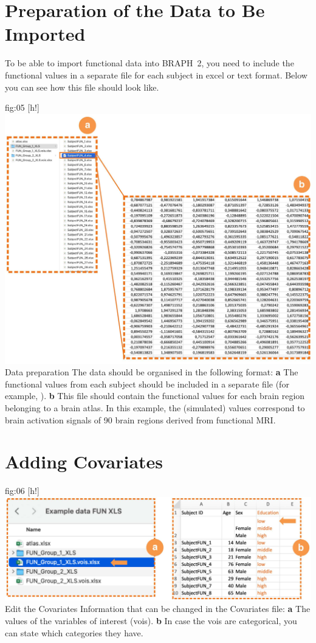 \documentclass[justified]{tufte-handout}
\begin{document}
\clearpage
\section{Preparation of the Data to Be Imported}

To be able to import functional data into BRAPH~2, you need to include the functional values in a separate file for each subject in excel or text format. Below you can see how this file should look like.

	{fig:05}
	{
	[h!]
	\includegraphics{fig05.jpg}
	}
	{Data preparation}
	{
	The data should be organised in the following format:
	{\bf a} The functional values from each subject should be included in a separate file (for example, ). 
	{\bf b} This file should contain the functional values for each brain region belonging to a brain atlas. In this example, the (simulated) values correspond to brain activation signals of 90 brain regions derived from functional MRI.
	}


\section{Adding Covariates}

	{fig:06}
	{
	[h!]
	\includegraphics{fig06.jpg}
	}
	{Edit the Covariates}
	{
	Information that can be changed in the Covariates file: 
	{\bf a} The values of the variables of interest (vois).
	{\bf b} In case the vois are categorical, you can state which categories they have.
	}
	
\end{document}
